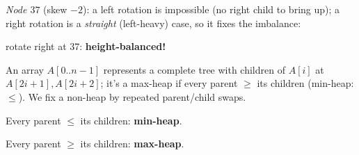\documentclass[12pt,twoside]{article}
\begin{document}
\begin{problems}
\begin{problemparts}
\emph{Node $37$} (skew $-2$): a left rotation is impossible (no right
child to bring up); a right rotation is a \emph{straight}
(left-heavy) case, so it fixes the imbalance:
\begin{center}
\hfill rotate right at 37: \textbf{height-balanced!}
\end{center}

\end{problemparts}

\newpage
\problem  %

An array $A[0..n-1]$ represents a complete tree with children of
$A[i]$ at $A[2i+1], A[2i+2]$; it's a max-heap if every parent $\ge$
its children (min-heap: $\le$). We fix a non-heap by repeated
parent/child swaps.

\begin{problemparts}

\problempart %
\begin{center}
\end{center}
Every parent $\le$ its children: \textbf{min-heap}.

\problempart %
\begin{center}
\end{center}
Every parent $\ge$ its children: \textbf{max-heap}.


\end{problemparts}
\end{problems}
\end{document}
